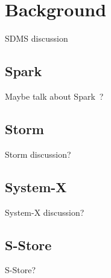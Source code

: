\section{Background}
SDMS discussion

\subsection{Spark}
Maybe talk about Spark~\cite{dstreams}?

\subsection{Storm}
Storm discussion?

\subsection{System-X} 
System-X discussion?

\subsection{S-Store}
S-Store?


